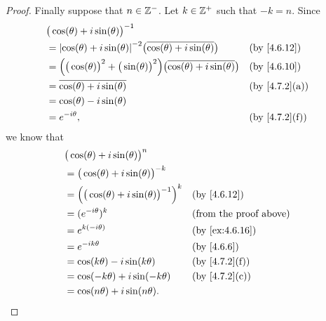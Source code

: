 \begin{proof}
  Finally suppose that \(n \in \mathbb{Z}^-\).
  Let \(k \in \mathbb{Z}^+\) such that \(-k = n\).
  Since
  \begin{align*}
     & \big(\cos(\theta) + i \sin(\theta)\big)^{-1}                                                                                                        \\
     & = \abs{\cos(\theta) + i \sin(\theta)}^{-2} \big(\overline{\cos(\theta) + i \sin(\theta)}\big)                      &  & \text{(by \cref{4.6.12})}   \\
     & = \Big(\big(\cos(\theta)\big)^2 + \big(\sin(\theta)\big)^2\Big) \big(\overline{\cos(\theta) + i \sin(\theta)}\big) &  & \text{(by \cref{4.6.10})}   \\
     & = \overline{\cos(\theta) + i \sin(\theta)}                                                                         &  & \text{(by \cref{4.7.2}(a))} \\
     & = \cos(\theta) - i \sin(\theta)                                                                                                                     \\
     & = e^{- i \theta},                                                                                                  &  & \text{(by \cref{4.7.2}(f))}
  \end{align*}
  we know that
  \begin{align*}
     & \big(\cos(\theta) + i \sin(\theta)\big)^n                                                     \\
     & = \big(\cos(\theta) + i \sin(\theta)\big)^{-k}                                                \\
     & = \Big(\big(\cos(\theta) + i \sin(\theta)\big)^{-1}\Big)^k &  & \text{(by \cref{4.6.12})}     \\
     & = (e^{- i \theta})^k                                       &  & \text{(from the proof above)} \\
     & = e^{k (- i \theta)}                                       &  & \text{(by \cref{ex:4.6.16})}  \\
     & = e^{- i k \theta}                                         &  & \text{(by \cref{4.6.6})}      \\
     & = \cos(k \theta) - i \sin(k \theta)                        &  & \text{(by \cref{4.7.2}(f))}   \\
     & = \cos(- k \theta) + i \sin(- k \theta)                    &  & \text{(by \cref{4.7.2}(c))}   \\
     & = \cos(n \theta) + i \sin(n \theta).

\end{align*}
\end{proof}
